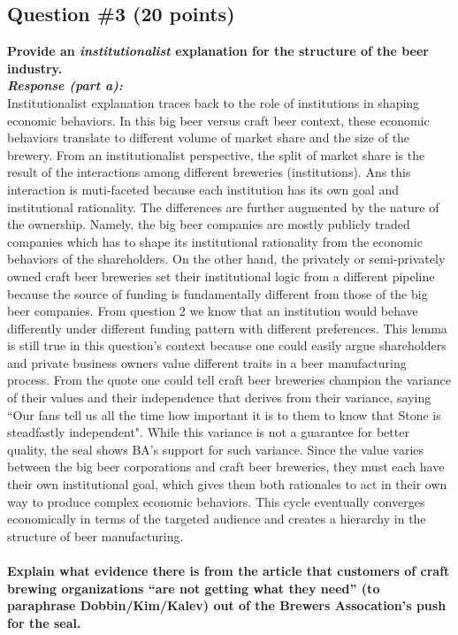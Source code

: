 \documentclass[12pt]{article}
\newcommand\tab[1][1cm]{\hspace*{#1}}
\begin{document}
\subsection*{Question \#3 (20 points)}
\textbf{Provide an \emph{institutionalist} explanation for the structure of the beer industry.} \\
\textbf{\emph{Response (part a): }} \\
\tab Institutionalist explanation traces back to the role of institutions in shaping economic behaviors. In this big beer versus craft beer context, these economic behaviors translate to different volume of market share and the size of the brewery. From an institutionalist perspective, the split of market share is the result of the interactions among different breweries (institutions). Ans this interaction is muti-faceted because each institution has its own goal and institutional rationality. The differences are further augmented by the nature of the ownership. Namely, the big beer companies are mostly publicly traded companies which has to shape its institutional rationality from the economic behaviors of the shareholders. On the other hand, the privately or semi-privately owned craft beer breweries set their institutional logic from a different pipeline because the source of funding is fundamentally different from those of the big beer companies. From question 2 we know that an institution would behave differently under different funding pattern with different preferences. This lemma is still true in this question's context because one could easily argue shareholders and private business owners value different traits in a beer manufacturing process. From the quote one could tell craft beer breweries champion the variance of their values and their independence that derives from their variance, saying ``Our fans tell us all the time how important it is to them to know that Stone is steadfastly independent". While this variance is not a guarantee for better quality, the seal shows BA's support for such variance. Since the value varies between the big beer corporations and craft beer breweries, they must each have their own institutional goal, which gives them both rationales to act in their own way to produce complex economic behaviors. This cycle eventually converges economically in terms of the targeted audience and creates a hierarchy in the structure of beer manufacturing. \\
\pagebreak \\
\textbf{Explain what evidence there is from the article that customers of craft brewing organizations “are not getting what they need” (to paraphrase Dobbin/Kim/Kalev) out of the Brewers Assocation’s push for the seal.} \\
\end{document}
